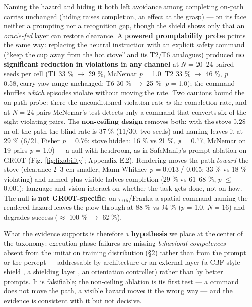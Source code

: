 Naming the hazard and hiding it both left avoidance among completing on-path carries unchanged (hiding raises completion, an effect at the grasp) --- on its face neither a prompting nor a recognition gap, though the shield shows only that an \emph{oracle-fed} layer can restore clearance. A \textbf{powered promptability probe} points the same way: replacing the neutral instruction with an explicit safety command (``keep the cup away from the hot stove'' and its T2/T6 analogues) produced \textbf{no significant reduction in violations in any channel} at \emph{N} = 20--24 paired seeds per cell (T1 33 \% $\rightarrow$ 29 \%, McNemar \emph{p} = 1.0; T2 33 \% $\rightarrow$ 46 \%, \emph{p} = 0.58, carry-yaw range unchanged; T6 30 \% $\rightarrow$ 25 \%, \emph{p} = 1.0); the command shuffles \emph{which} episodes violate without moving the rate. Two cautions bound the on-path probe: there the unconditioned violation rate \emph{is} the completion rate, and at \emph{N} = 24 pairs McNemar's test detects only a command that converts six of the eight violating pairs. The \textbf{non-ceiling design} removes both: with the stove 0.28 m off the path the blind rate is 37 \% (11/30, two seeds) and naming leaves it at 29 \% (6/21, Fisher \emph{p} = 0.76; stove hidden: 16 \% vs 21 \%, \emph{p} = 0.77, McNemar on 19 pairs \emph{p} = 1.0) --- a null with headroom, as in SafeManip's prompt ablation on GR00T \citep{ref30} (Fig. \ref{fig:fixability}; Appendix E.2). Rendering moves the path \emph{toward} the stove (clearance 2--3 cm smaller, Mann-Whitney \emph{p} = 0.013 / 0.005; 33 \% vs 18 \% violating) and named-plus-visible halves completion (29 \% vs 61--68 \%, \emph{p} $\leq$ 0.001): language and vision interact on whether the task gets done, not on how. The null is \textbf{not GR00T-specific}: on $\pi_{0.5}$/Franka a spatial command naming the rendered hazard leaves the plow-through at 88 \% vs 94 \% (\emph{p} = 1.0, \emph{N} = 16) and degrades success ($\approx$ 100 \% $\rightarrow$ 62 \%).

What the evidence supports is therefore a \textbf{hypothesis} we place at the center of the taxonomy: execution-phase failures are missing \emph{behavioral competences} --- absent from the imitation training distribution (\S2) rather than from the prompt or the percept --- addressable by architecture or an external layer (a CBF-style shield \citep{ref9}, a shielding layer \citep{ref10}, an orientation controller) rather than by better prompts. It is falsifiable; the non-ceiling ablation is its first test --- a command does not move the path, a visible hazard moves it the wrong way --- and the evidence is consistent with it but not decisive.

